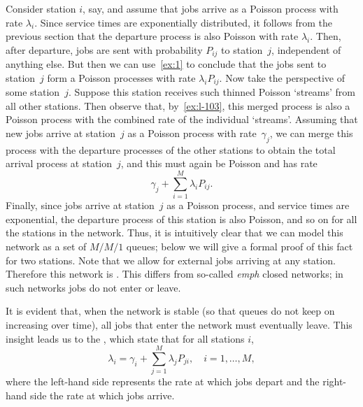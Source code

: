 \documentclass[companion]{subfiles}
\begin{document}
Consider station $i$, say, and assume that jobs arrive as a Poisson process with rate $\lambda_i$.
Since service times are exponentially distributed, it follows from the previous section that the departure process is also Poisson with rate $\lambda_i$.
Then, after departure, jobs are sent with probability $P_{i j}$ to station~$j$, independent of anything else.
But then we can use~\cref{ex:1} to conclude that the jobs sent to station~$j$ form a Poisson processes with rate $\lambda_i P_{i j}$.
Now take the perspective of some station~$j$.
Suppose this station receives such thinned Poisson `streams' from all other stations.
Then observe that, by~\cref{ex:l-103}, this merged process is also a Poisson process with the combined rate of the individual `streams'.
Assuming that new jobs arrive at station~$j$ as a Poisson process with rate~$\gamma_j$, we can merge this process with the departure processes of the other stations to obtain the total arrival process at station~$j$, and this must again be Poisson and has rate
\begin{equation*}
\gamma_j + \sum_{i=1}^M \lambda_i P_{i j}.
\end{equation*}
Finally, since jobs arrive at station~$j$ as a Poisson process, and service times are exponential, the departure process of this station is also Poisson, and so on for all the stations in the network.
Thus, it is intuitively clear that we can model this network as a set of $M/M/1$ queues; below we will give a formal proof of this fact for two stations.
Note that we allow for external jobs arriving at any station.
Therefore this network is .
This differs from so-called \emph{emph} closed networks; in such networks jobs do not enter or leave.

It is evident that, when the network is stable (so that queues do not keep on increasing over time), all jobs that enter the network must eventually leave.
This insight leads us to the , which state that for all stations $i$, 
\begin{equation}
  \label{eq:101}
  \lambda_i = \gamma_i + \sum_{j=1}^M \lambda_j P_{j i}, \quad i = 1, \ldots, M,
\end{equation}
where the left-hand side represents the rate at which jobs depart and the right-hand side the rate at which jobs arrive. 
\end{document}
